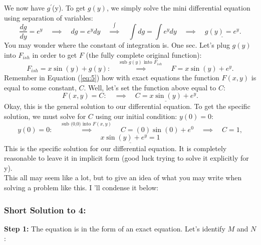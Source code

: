 \documentclass[a4paper,12pt]{article} %
\begin{document}
We now have $g^{\prime}$(y). To get $g(y)$, we simply solve the mini differential equation using separation of variables:
$$ \frac{dg}{dy} = e^y \quad\implies \quad dg = e^ydy \quad\overset{\int}\implies \quad \int dg = \int e^y dy \quad\implies \quad \underline{g(y) = e^y }.$$
You may wonder where the constant of integration is. One sec. Let's plug $g(y)$ into $F_{ish}$ in order to get $F$ (the fully complete original function):
$$ F_{ish} = x\sin(y) + g(y): \quad \overset{\text{sub $g(y)$ into }F_{ish}}\implies \quad F = x\sin(y) + e^y.$$
Remember in Equation (\ref{eq:5}) how with exact equations the function $F(x,y)$ is equal to some constant, $C$. Well, let's set the function above equal to $C$:
$$ F(x,y)=C: \quad\implies \quad \underline{C = x\sin(y) + e^y}. $$
Okay, this is the general solution to our differential equation. To get the specific solution, we must solve for $C$ using our initial condition: $y(0)=0$:
$$ y(0)=0: \quad\overset{\text{sub (0,0) into }F(x,y)}\implies \quad C = (0)\sin(0) + e^0 \quad\implies \quad C = 1, $$
$$ \underline{\boxed{x\sin(y) + e^y = 1}} $$
This is the specific solution for our differential equation. It is completely reasonable to leave it in implicit form (good luck trying to solve it explicitly for y).
\\ 

This all may seem like a lot, but to give an idea of what you may write when solving a problem like this. I ’ll condense it below:

\subsubsection*{Short Solution to 4:}
\textbf{Step 1:} The equation is in the form of an exact equation. Let's identify $M$ and $N$:
\end{document}
